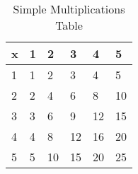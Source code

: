 
\begin{table}[h!]
\centering
\begin{tabular}{|l|lllll}
\hline
x & \multicolumn{1}{l|}{1} & \multicolumn{1}{l|}{2} & \multicolumn{1}{l|}{3} & \multicolumn{1}{l|}{4} & \multicolumn{1}{l|}{5} \\ \hline
1 & 1                      & 2                      & 3                      & 4                      & 5                      \\ \cline{1-1}
2 & 2                      & 4                      & 6                      & 8                      & 10                     \\ \cline{1-1}
3 & 3                      & 6                      & 9                      & 12                     & 15                     \\ \cline{1-1}
4 & 4                      & 8                      & 12                     & 16                     & 20                     \\ \cline{1-1}
5 & 5                      & 10                     & 15                     & 20                     & 25                     \\ \cline{1-1}
\end{tabular}


\caption{Simple Multiplications Table}


\end{table}